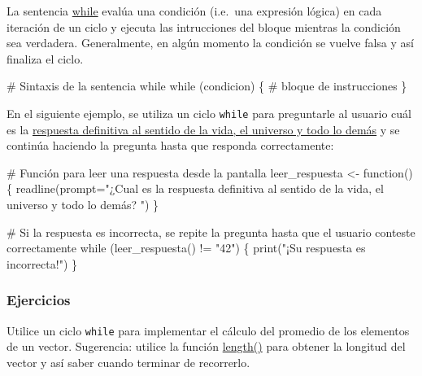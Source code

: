 \documentclass[
  letterpaper,
  DIV=11,
  numbers=noendperiod]{scrreprt}
\newenvironment{Shaded}{\begin{snugshade}}{\end{snugshade}}
\newcommand{\AttributeTok}[1]{\textcolor[rgb]{0.40,0.45,0.13}{#1}}
\newcommand{\CommentTok}[1]{\textcolor[rgb]{0.37,0.37,0.37}{#1}}
\newcommand{\ControlFlowTok}[1]{\textcolor[rgb]{0.00,0.23,0.31}{#1}}
\newcommand{\FunctionTok}[1]{\textcolor[rgb]{0.28,0.35,0.67}{#1}}
\newcommand{\NormalTok}[1]{\textcolor[rgb]{0.00,0.23,0.31}{#1}}
\newcommand{\OtherTok}[1]{\textcolor[rgb]{0.00,0.23,0.31}{#1}}
\newcommand{\SpecialCharTok}[1]{\textcolor[rgb]{0.37,0.37,0.37}{#1}}
\newcommand{\StringTok}[1]{\textcolor[rgb]{0.13,0.47,0.30}{#1}}
\begin{document}
La sentencia
\href{https://cran.r-project.org/doc/manuals/r-devel/R-lang.html\#while}{while}
evalúa una condición (i.e.~una expresión lógica) en cada iteración de un
ciclo y ejecuta las intrucciones del bloque mientras la condición sea
verdadera. Generalmente, en algún momento la condición se vuelve falsa y
así finaliza el ciclo.

\begin{Shaded}
\begin{Highlighting}[]
\CommentTok{\# Sintaxis de la sentencia while}
\ControlFlowTok{while}\NormalTok{ (condicion) \{}
  \CommentTok{\# bloque de instrucciones }
\NormalTok{\}}
\end{Highlighting}
\end{Shaded}

En el siguiente ejemplo, se utiliza un ciclo \texttt{while} para
preguntarle al usuario cuál es la
\href{https://en.wikipedia.org/wiki/42_(number)\#The_Hitchhiker's_Guide_to_the_Galaxy}{respuesta
definitiva al sentido de la vida, el universo y todo lo demás} y se
continúa haciendo la pregunta hasta que responda correctamente:

\begin{Shaded}
\begin{Highlighting}[]
\CommentTok{\# Función para leer una respuesta desde la pantalla}
\NormalTok{leer\_respuesta }\OtherTok{\textless{}{-}} \ControlFlowTok{function}\NormalTok{() \{}
  \FunctionTok{readline}\NormalTok{(}\AttributeTok{prompt=}\StringTok{"¿Cual es la respuesta definitiva al sentido de la vida, el universo y todo lo demás? "}\NormalTok{)}
\NormalTok{\}}

\CommentTok{\# Si la respuesta es incorrecta, se repite la pregunta hasta que el usuario conteste correctamente}
\ControlFlowTok{while}\NormalTok{ (}\FunctionTok{leer\_respuesta}\NormalTok{() }\SpecialCharTok{!=} \StringTok{"42"}\NormalTok{) \{   }
  \FunctionTok{print}\NormalTok{(}\StringTok{"¡Su respuesta es incorrecta!"}\NormalTok{)}
\NormalTok{\}}
\end{Highlighting}
\end{Shaded}

\hypertarget{ejercicios-8}{%
\subsubsection{Ejercicios}\label{ejercicios-8}}

Utilice un ciclo \texttt{while} para implementar el cálculo del promedio
de los elementos de un vector. Sugerencia: utilice la función
\href{https://rdrr.io/r/base/length.html}{length()} para obtener la
longitud del vector y así saber cuando terminar de recorrerlo.
\end{document}
